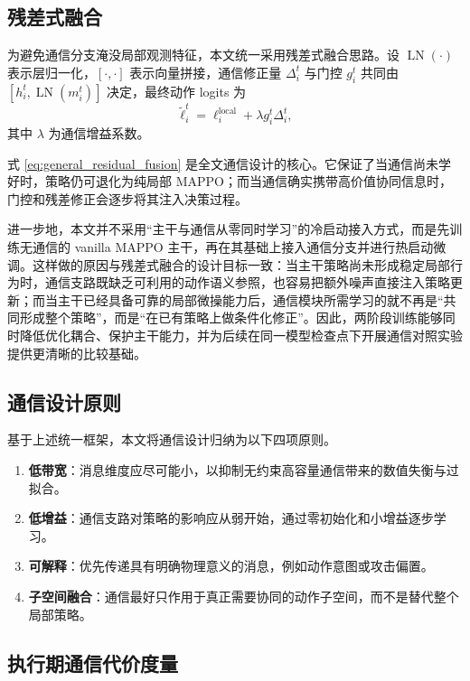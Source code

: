 \subsection{残差式融合}

为避免通信分支淹没局部观测特征，本文统一采用残差式融合思路。设 $\operatorname{LN}(\cdot)$ 表示层归一化，$[\cdot,\cdot]$ 表示向量拼接，通信修正量 $\Delta_i^t$ 与门控 $g_i^t$ 共同由 $[h_i^t,\operatorname{LN}(m_i^t)]$ 决定，最终动作 logits 为
\begin{equation}
\tilde{\ell}_i^t
=
\ell_i^{\text{local}} + \lambda g_i^t \Delta_i^t,
\label{eq:general_residual_fusion}
\end{equation}
其中 $\lambda$ 为通信增益系数。

式 \eqref{eq:general_residual_fusion} 是全文通信设计的核心。它保证了当通信尚未学好时，策略仍可退化为纯局部 MAPPO；而当通信确实携带高价值协同信息时，门控和残差修正会逐步将其注入决策过程。

进一步地，本文并不采用“主干与通信从零同时学习”的冷启动接入方式，而是先训练无通信的 vanilla MAPPO 主干，再在其基础上接入通信分支并进行热启动微调。这样做的原因与残差式融合的设计目标一致：当主干策略尚未形成稳定局部行为时，通信支路既缺乏可利用的动作语义参照，也容易把额外噪声直接注入策略更新；而当主干已经具备可靠的局部微操能力后，通信模块所需学习的就不再是“共同形成整个策略”，而是“在已有策略上做条件化修正”。因此，两阶段训练能够同时降低优化耦合、保护主干能力，并为后续在同一模型检查点下开展通信对照实验提供更清晰的比较基础。

\subsection{通信设计原则}

基于上述统一框架，本文将通信设计归纳为以下四项原则。
\begin{enumerate}
    \item \textbf{低带宽}：消息维度应尽可能小，以抑制无约束高容量通信带来的数值失衡与过拟合。
    \item \textbf{低增益}：通信支路对策略的影响应从弱开始，通过零初始化和小增益逐步学习。
    \item \textbf{可解释}：优先传递具有明确物理意义的消息，例如动作意图或攻击偏置。
    \item \textbf{子空间融合}：通信最好只作用于真正需要协同的动作子空间，而不是替代整个局部策略。
\end{enumerate}

\subsection{执行期通信代价度量}

